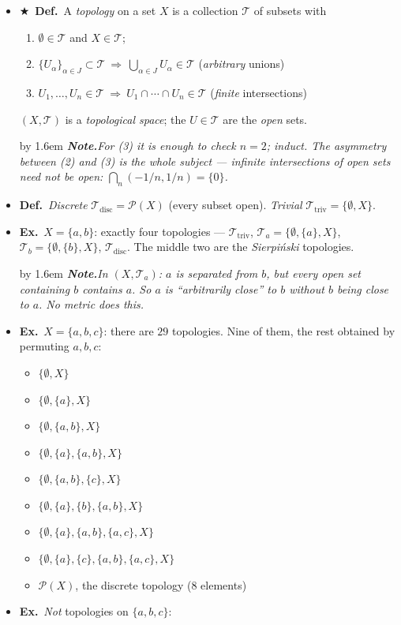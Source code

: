 \documentclass[12pt,a4paper]{article}
\newcommand{\Dfn}{\textbf{Def.}~}
\newcommand{\Exa}{\textbf{Ex.}~}
\newcommand{\Key}{$\bigstar$~}                  %
\newcommand{\Cue}[1]{%
  \par\addvspace{7pt}\nopagebreak
  \begingroup
    \advance\leftskip by 1.6em
    \parindent=0pt \small\color{cue}%
    \textbf{\textit{Note.}}\enspace \textit{#1}\par
  \endgroup
  \addvspace{9pt}}
\newenvironment{BL}%
  {\begin{itemize}[leftmargin=1.4em,labelsep=0.55em,itemsep=11pt,topsep=11pt,parsep=0pt]}%
  {\end{itemize}}
\newenvironment{SB}%
  {\begin{itemize}[label=--,leftmargin=1.3em,labelsep=0.45em,itemsep=6pt,topsep=7pt,parsep=0pt]}%
  {\end{itemize}}
\newenvironment{NL}%
  {\begin{enumerate}[label=(\arabic*),leftmargin=2em,labelsep=0.45em,itemsep=6pt,topsep=7pt,parsep=0pt]}%
  {\end{enumerate}}
\newcommand{\cT}{\mathcal{T}}
\newcommand{\Pow}{\mathcal{P}}
\newcommand{\imp}{\Rightarrow}
\newcommand{\Tdisc}{\cT_{\mathrm{disc}}}
\newcommand{\Ttriv}{\cT_{\mathrm{triv}}}
\begin{document}
\begin{BL}
\item \Key\Dfn A \emph{topology} on a set $X$ is a collection $\cT$ of subsets with
  \begin{NL}
  \item $\emptyset\in\cT$ and $X\in\cT$;
  \item $\{U_\alpha\}_{\alpha\in J}\subset\cT\ \imp\ \bigcup_{\alpha\in J}U_\alpha\in\cT$
        \hfill (\emph{arbitrary} unions)
  \item $U_1,\dots,U_n\in\cT\ \imp\ U_1\cap\cdots\cap U_n\in\cT$
        \hfill (\emph{finite} intersections)
  \end{NL}
  $(X,\cT)$ is a \emph{topological space}; the $U\in\cT$ are the \emph{open} sets.
\Cue{For (3) it is enough to check $n=2$; induct. The asymmetry between (2) and (3) is the whole
subject --- infinite intersections of open sets need not be open: $\bigcap_n(-1/n,1/n)=\{0\}$.}
\item \Dfn \emph{Discrete} $\Tdisc=\Pow(X)$ (every subset open).\quad
      \emph{Trivial} $\Ttriv=\{\emptyset,X\}$.
\item \Exa $X=\{a,b\}$: exactly four topologies ---
      $\Ttriv$, \; $\cT_a=\{\emptyset,\{a\},X\}$, \; $\cT_b=\{\emptyset,\{b\},X\}$, \; $\Tdisc$.
      The middle two are the \emph{Sierpi\'nski} topologies.
\Cue{In $(X,\cT_a)$: $a$ is separated from $b$, but every open set containing $b$ contains $a$.
So $a$ is ``arbitrarily close'' to $b$ without $b$ being close to $a$. No metric does this.}
\item \Exa $X=\{a,b,c\}$: there are $29$ topologies. Nine of them, the rest obtained by
      permuting $a,b,c$:
  \begin{SB}
  \item $\{\emptyset,X\}$
  \item $\{\emptyset,\{a\},X\}$
  \item $\{\emptyset,\{a,b\},X\}$
  \item $\{\emptyset,\{a\},\{a,b\},X\}$
  \item $\{\emptyset,\{a,b\},\{c\},X\}$
  \item $\{\emptyset,\{a\},\{b\},\{a,b\},X\}$
  \item $\{\emptyset,\{a\},\{a,b\},\{a,c\},X\}$
  \item $\{\emptyset,\{a\},\{c\},\{a,b\},\{a,c\},X\}$
  \item $\Pow(X)$, the discrete topology (8 elements)
  \end{SB}
\item \Exa \emph{Not} topologies on $\{a,b,c\}$:

\end{BL}
\end{document}
